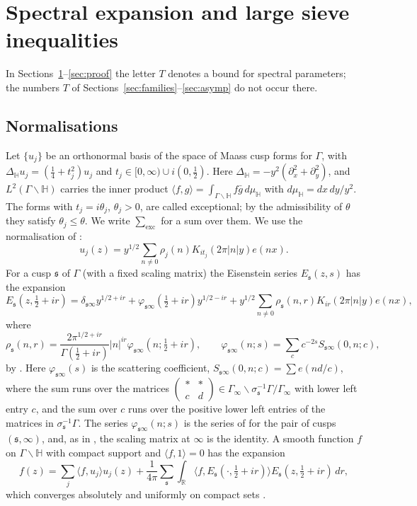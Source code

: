 \documentclass[11pt]{amsart}
\theoremstyle{remark}
\theoremstyle{definition}
\numberwithin{equation}{section}
\newcommand{\R}{\mathbb{R}}
\newcommand{\Hb}{\mathbb{H}}
\newcommand{\gs}{\mathfrak{s}}
\newcommand{\br}[1]{\langle #1\rangle}
\newcommand{\exc}{\mathrm{exc}}
\newcommand{\dmu}{d\mu_{\Hb}}
\begin{document}
\section{Spectral expansion and large sieve inequalities}\label{sec:spectral}

In Sections~\ref{sec:spectral}--\ref{sec:proof} the letter $T$ denotes a bound for spectral parameters; the numbers $T$ of Sections~\ref{sec:families}--\ref{sec:asymp} do not occur there.

\subsection{Normalisations}
Let $\{u_j\}$ be an orthonormal basis of the space of Maass cusp forms for $\Gamma$, with $\Delta_\Hb u_j=(\frac14+t_j^2)u_j$ and $t_j\in[0,\infty)\cup i(0,\frac12)$. Here $\Delta_\Hb=-y^2(\partial_x^2+\partial_y^2)$, and $L^2(\Gamma\backslash\Hb)$ carries the inner product $\br{f,g}=\int_{\Gamma\backslash\Hb}f\bar g\,\dmu$ with $\dmu=dx\,dy/y^2$. The forms with $t_j=i\theta_j$, $\theta_j>0$, are called exceptional; by the admissibility of $\theta$ they satisfy $\theta_j\le\theta$. We write $\sum_{\exc}$ for a sum over them. We use the normalisation of \cite[(3.15)]{Pas}:
\[
u_j(z)=y^{1/2}\sum_{n\ne0}\rho_j(n)K_{it_j}(2\pi|n|y)e(nx).
\]
For a cusp $\gs$ of $\Gamma$ (with a fixed scaling matrix) the Eisenstein series $E_\gs(z,s)$ has the expansion
\[
E_\gs(z,\tfrac12+ir)=\delta_{\gs\infty}y^{1/2+ir}+\varphi_{\gs\infty}(\tfrac12+ir)y^{1/2-ir}+y^{1/2}\sum_{n\ne0}\rho_\gs(n,r)K_{ir}(2\pi|n|y)e(nx),
\]
where
\[
\rho_\gs(n,r)=\frac{2\pi^{1/2+ir}}{\Gamma(\frac12+ir)}|n|^{ir}\varphi_{\gs\infty}(n;\tfrac12+ir),\qquad\varphi_{\gs\infty}(n;s)=\sum_{c}c^{-2s}S_{\gs\infty}(0,n;c),
\]
by \cite[Theorem~3.4]{Iw}. Here $\varphi_{\gs\infty}(s)$ is the scattering coefficient, $S_{\gs\infty}(0,n;c)=\sum e(nd/c)$, where the sum runs over the matrices $\left(\begin{smallmatrix}*&*\\c&d\end{smallmatrix}\right)\in\Gamma_\infty\backslash\sigma_\gs^{-1}\Gamma/\Gamma_\infty$ with lower left entry $c$, and the sum over $c$ runs over the positive lower left entries of the matrices in $\sigma_\gs^{-1}\Gamma$. The series $\varphi_{\gs\infty}(n;s)$ is the series of \cite[(3.16)]{Pas} for the pair of cusps $(\gs,\infty)$, and, as in \cite[(3.9)]{Pas}, the scaling matrix at $\infty$ is the identity. A smooth function $f$ on $\Gamma\backslash\Hb$ with compact support and $\br{f,1}=0$ has the expansion
\begin{equation}\label{eq:expansion}
f(z)=\sum_j\br{f,u_j}u_j(z)+\frac1{4\pi}\sum_\gs\int_\R\br{f,E_\gs(\cdot,\tfrac12+ir)}E_\gs(z,\tfrac12+ir)\,dr,
\end{equation}
which converges absolutely and uniformly on compact sets \cite[Theorem~7.3]{Iw}.
\end{document}
